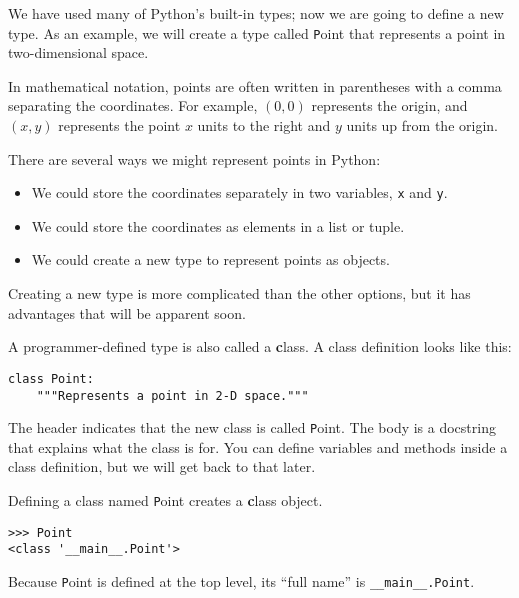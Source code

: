 \documentclass[
DIV=11,
fontsize=12,
twoside,
headinclude=false,
titlepage=firstiscover,
abstract=true,
headsepline=true,
footsepline=true,
chapterprefix=true, %
headings=big,
bibliography=totoc,%
captions=tableheading
]{scrbook}
\theoremstyle{definition}
\begin{document}
We have used many of Python's built-in types; now we are going
to define a new type.  As an example, we will create a type
called {\texttt Point} that represents a point in two-dimensional
space.

In mathematical notation, points are often written in
parentheses with a comma separating the coordinates. For example,
$(0,0)$ represents the origin, and $(x,y)$ represents the
point $x$ units to the right and $y$ units up from the origin.

There are several ways we might represent points in Python:

\begin{itemize}

\item We could store the coordinates separately in two
variables, {\texttt x} and {\texttt y}.

\item We could store the coordinates as elements in a list
or tuple.

\item We could create a new type to represent points as
objects.

\end{itemize}

Creating a new type
is more complicated than the other options, but
it has advantages that will be apparent soon.

A programmer-defined type is also called a {\textbf class}.
A class definition looks like this:

\begin{lstlisting}
class Point:
    """Represents a point in 2-D space."""
\end{lstlisting}
%
The header indicates that the new class is called {\texttt Point}.
The body is a docstring that explains what the class is for.
You can define variables and methods inside a class definition,
but we will get back to that later.

Defining a class named {\texttt Point} creates a {\textbf class object}.

\begin{lstlisting}
>>> Point
<class '__main__.Point'>
\end{lstlisting}
%
Because {\texttt Point} is defined at the top level, its ``full
name'' is \verb"__main__.Point".
\end{document}

